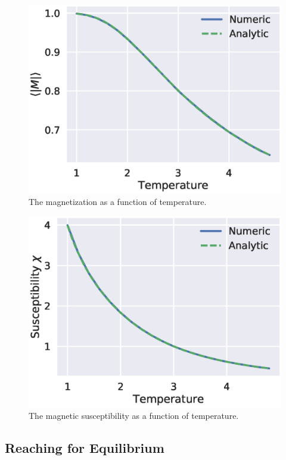 \documentclass[aps,reprint]{revtex4-1}
\begin{document}
\begin{figure}[H]
  \centering
  \includegraphics[width=\columnwidth]{figures/4bMagnetization.eps}
  \caption{The magnetization as a function of temperature.}
  \label{fig:4bmag}
\end{figure}

\begin{figure}[H]
  \centering
  \includegraphics[width=\columnwidth]{figures/4bSusceptibility.eps}
  \caption{The magnetic susceptibility as a function of temperature.}
  \label{fig:4bsusceptibility}
\end{figure}

\subsection{Reaching for Equilibrium}
\label{sec:reaching-equilibrium}
\end{document}
